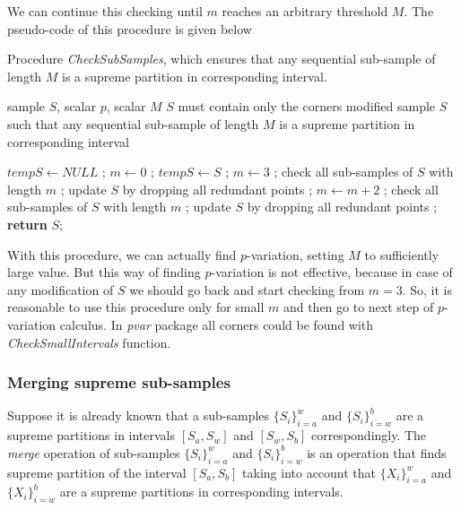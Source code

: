 \documentclass[12pt, a4paper]{article}
\numberwithin{equation}{section}
\begin{document}
We can continue this checking until $m$ 
reaches an arbitrary threshold $M$.
The  pseudo-code  of this procedure is given below

\begin{algorithm}[H]
\caption{Procedure \emph{CheckSubSamples}, which ensures 
that any sequential sub-sample of length $M$ is a supreme partition in corresponding interval.}
\label{alg:CheckSubSamples}
\begin{algorithmic}[1]
\Input sample $S$, scalar $p$, scalar $M$
\Require $S$ must contain only the corners
\Output modified sample $S$ such that any sequential sub-sample of length $M$ is a supreme partition in corresponding interval

\State $tempS \leftarrow NULL$ ;
\State $m \leftarrow 0$ ;
  \State $tempS \leftarrow S$ ;
  \State $m \leftarrow 3$ ;
  \State check all sub-samples of $S$ with length $m$ ;
  \State update $S$ by dropping all redundant points ;  
    \State $m \leftarrow m + 2$ ;
    \State check all sub-samples of $S$ with length $m$ ;
    \State update $S$ by dropping all redundant points ; 
  \EndWhile
\EndWhile
\State \textbf{return} $S$;
\EndFunction
\end{algorithmic}
\end{algorithm}


With this procedure, we can actually find 
$p$-variation, setting $M$ to sufficiently large value.
But this way of finding $p$-variation is not effective, 
because in case of any modification of $S$ 
we should go back and start checking
from $m=3$.
So, it is reasonable to use this procedure
only for small $m$ and then go
to next step of $p$-variation calculus.
In \emph{pvar} package all corners could be found with \emph{CheckSmallIntervals} function.


\subsubsection{Merging supreme sub-samples}
\label{sec:meging}

Suppose it is already known that 
a sub-samples $\{S_{i}\}_{i=a}^{w}$  
and $\{S_{i}\}_{i=w}^{b}$
are a supreme partitions in intervals 
$[S_a,S_w]$ and $[S_w,S_b]$ correspondingly. 
The \emph{merge} operation of sub-samples 
$\{S_{i}\}_{i=a}^{w}$ and $\{S_{i}\}_{i=w}^{b}$
is an operation that finds supreme partition 
of the interval $[S_a,S_b]$ taking into account
that  $\{X_{i}\}_{i=a}^{w}$  and $\{X_{i}\}_{i=w}^{b}$
are a supreme partitions in corresponding intervals.
\end{document}
